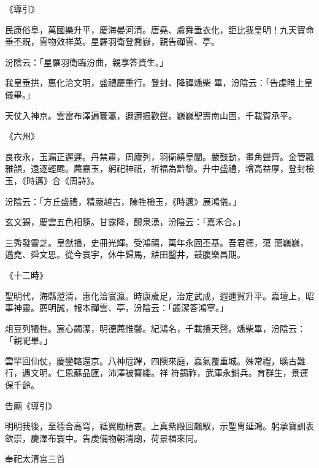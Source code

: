 \begin{pinyinscope}
 《導引》



 民康俗阜，萬國樂升平，慶海晏河清。唐堯、虞舜垂衣化，詎比我皇明！九天寶命垂丕貺，雲物效祥英。星羅羽衛登喬嶽，親告禪雲、亭。



 汾陰云：「星羅羽衛臨汾曲，親享答資生。」



 我皇垂拱，惠化洽文明，盛禮慶重行。登封、降禪燔柴
 畢，汾陰云：「告虔睢上皇儀畢。」



 天仗入神京。雲雷布澤遍寰瀛，遐邇振歡聲。巍巍聖壽南山固，千載賀承平。



 《六州》



 良夜永，玉漏正遲遲。丹禁肅，周廬列，羽衛繞皇闈。嚴鼓動，畫角聲齊。金管飄雅韻，遠逐輕颸。薦嘉玉，躬祀神祇，祈福為黔黎。升中盛禮，增高益厚，登封檢玉，《時邁》合《周詩》。



 汾陰云：「方丘盛禮，精嚴越古，陳牲檢玉，《時邁》展鴻儀。」



 玄文錫，慶雲五色相隨。甘露降，醴泉湧，汾陰云：「嘉禾合。」



 三秀發靈芝。皇猷播，史冊光輝。受鴻禧，萬年永固丕基。吾君德，蕩
 蕩巍巍，邁堯、舜文思。從今寰宇，休牛歸馬，耕田鑿井，鼓腹樂昌期。



 《十二時》



 聖明代，海縣澄清，惠化洽寰瀛。時康歲足，治定武成，遐邇賀升平。嘉壇上，昭事神靈。薦明誠，報本禪雲、亭，汾陰云：「蠲潔答鴻寧。」



 俎豆列犧牲。宸心蠲潔，明德薦惟馨。紀鴻名，千載播天聲。燔柴畢，汾陰云：「親祀畢。」



 雲罕回仙仗，慶鑾輅還京。八神卮蹕，四隩來庭，嘉氣覆重城。殊常禮，曠古難行，遇文明。仁恩蘇品匯，沛澤被簪纓。祥
 符錫祚，武庫永銷兵。育群生，景運保千齡。



 告廟《導引》



 明明我後，至德合高穹，祗翼勵精衷。上真紫殿回飆馭，示聖冑延鴻。躬承寶訓表欽崇，慶澤布寰中。告虔備物朝清廟，荷景福來同。



 奉祀太清宮三首




\end{pinyinscope}
